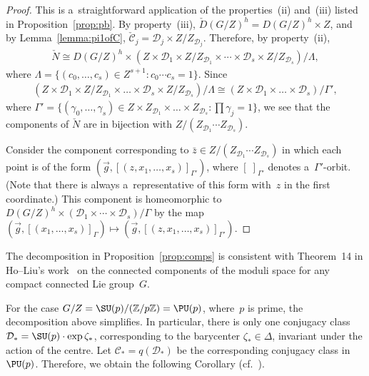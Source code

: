 \begin{proof}
This is a~straightforward application of the properties~(ii) %
and~(iii) %
listed in Proposition~\ref{prop:pb}.
By property~(iii), $\check{D}(G/Z)^h = D(G/Z)^h \times Z$, and by Lemma~\ref{lemma:pi1ofC},
$\check{\mathcal{C}}_j = \mathcal{D}_j \times Z/Z_{\mathcal{D}_j}$.
Therefore, by property~(ii),
\begin{gather*}
\check{N} \cong D(G/Z)^h \times (Z\times \mathcal{D}_1 \times Z/Z_{\mathcal{D}_1} \times \cdots \times \mathcal{D}_s
\times Z/Z_{\mathcal{D}_s})/\Lambda,
\end{gather*}
where $\Lambda={\{(c_0, \ldots, c_{s}) \in Z^{s+1} \colon c_0 \cdots c_{s}=1\}}$.
Since
\begin{gather*}
(Z\times \mathcal{D}_1 \times Z/Z_{\mathcal{D}_1} \times \dots \times \mathcal{D}_s \times Z/Z_{\mathcal{D}_s})/\Lambda
\cong (Z\times \mathcal{D}_1 \times \dots \times \mathcal{D}_s)/\Gamma',
\end{gather*}
where $\Gamma'=\{(\gamma_0, \ldots, \gamma_{s}) \in Z\times Z_{\mathcal{D}_1} \times \dots \times Z_{\mathcal{D}_s}
\colon \prod \gamma_j =1\}$, we see that the components of $\check{N}$ are in bijection with $Z/(Z_{\mathcal{D}_1} \cdots
Z_{\mathcal{D}_s})$.

Consider the component corresponding to $\bar{z} \in Z/(Z_{\mathcal{D}_1}\cdots Z_{\mathcal{D}_s})$ in which each point
is of the form $(\vec{g},[(z,x_1, \ldots, x_s)]_{\Gamma'})$, where $[\;]_{\Gamma'}$
denotes a~$\Gamma'$-orbit.
(Note that there is always a~representative of this form with~$z$ in the f\/irst coordinate.) This component is
homeomorphic to $D(G/Z)^h \times (\mathcal{D}_1 \times \cdots \times \mathcal{D}_s)/\Gamma$ by the map $(\vec{g},[(x_1, \ldots,
x_s)]_{\Gamma}) \mapsto (\vec{g},[(z,x_1, \ldots, x_s)]_{\Gamma'})$.
\end{proof}

\begin{Remark}
The decomposition in Proposition~\ref{prop:comps} is consistent with Theorem~14 in Ho--Liu's work~\cite{HL} on the
connected components of the moduli space for any compact connected Lie group~$G$.
\end{Remark}

For the case $G/Z=\SU(p)/({\mathbb{Z}}/p{\mathbb{Z}})=\PU(p)$, where~$p$ is prime, the decomposition above simplif\/ies.
In particular, there is only one conjugacy class $\mathcal{D}_*=\SU(p) \cdot \exp \zeta_*$, corresponding to the
barycenter $\zeta_* \in \Delta$, invariant under the action of the centre.
Let $\mathcal{C}_*=q(\mathcal{D}_*)$ be the corresponding conjugacy class in $\PU(p)$.
Therefore, we obtain the following Corollary (cf.~\cite[Lemma 2.3]{KM}).

